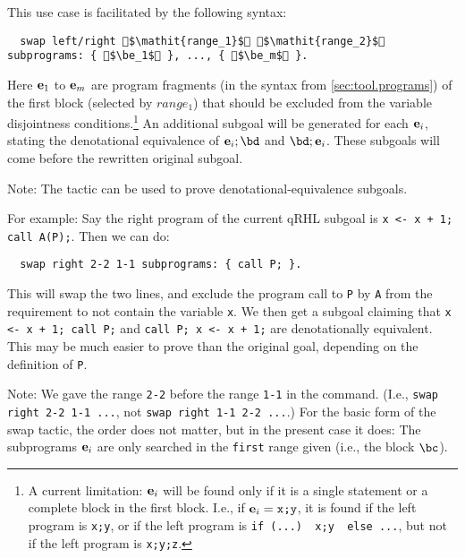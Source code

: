 \documentclass{article}
\begin{document}
This use case is facilitated by the following syntax:
\begin{lstlisting}
  swap left/right $\mathit{range_1}$ $\mathit{range_2}$ subprograms: { $\be_1$ }, ..., { $\be_m$ }.
\end{lstlisting}
Here $\mathbf e_1$ to $\mathbf e_m$ are program fragments (in the syntax from \autoref{sec:tool.programs}) of the first block (selected by $\mathit{range_1}$) that should be excluded from the variable disjointness conditions.\footnote{%
  A current limitation: $\mathbf e_i$ will be found only if it is a single statement or a complete block in the first block.
  I.e., if $\be_i=\texttt{x;y}$, it is found if the left program is \texttt{x;y}, or if the left program is \texttt{if (...) { x;y } else ...}, but not if the left program is \texttt{x;y;z}.}
An additional subgoal will be generated for each $\mathbf e_i$, stating the denotational equivalence of $\be_i;\bd$ and $\bd;\be_i$.
These subgoals will come before the rewritten original subgoal.

Note: The  tactic can be used to prove denotational-equivalence subgoals.

\medskip

For example: Say the right program of the current qRHL subgoal is \texttt{x <- x + 1; call A(P);}. Then we can do:
\begin{lstlisting}
  swap right 2-2 1-1 subprograms: { call P; }.
\end{lstlisting}
This will swap the two lines, and exclude the program call to \texttt{P} by \texttt{A} from the requirement to not contain the variable \texttt{x}.
We then get a subgoal claiming that \texttt{x <- x + 1; call P;} and \texttt{call P; x <- x + 1;} are denotationally equivalent.
This may be much easier to prove than the original goal, depending on the definition of \texttt{P}.

Note: We gave the range \texttt{2-2} before the range \texttt{1-1} in the command.
(I.e., \texttt{swap right 2-2 1-1 ...}, not \texttt{swap right 1-1 2-2 ...}.)
For the basic form of the swap tactic, the order does not matter, but in the present case it does:
The subprograms $\mathbf e_i$ are only searched in the \texttt{first} range given (i.e., the block $\bc$).

\medskip
\end{document}

